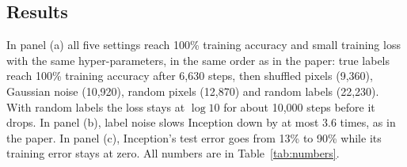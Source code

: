\subsection{Results}
In panel (a) all five settings reach 100\% training accuracy and small training loss with the same hyper-parameters, in the same order as in the paper: true labels reach 100\% training accuracy after 6{,}630 steps, then shuffled pixels (9{,}360), Gaussian noise (10{,}920), random pixels (12{,}870) and random labels (22{,}230). With random labels the loss stays at $\log 10$ for about 10{,}000 steps before it drops. In panel (b), label noise slows Inception down by at most 3.6 times, as in the paper. In panel (c), Inception's test error goes from 13\% to 90\% while its training error stays at zero. All numbers are in Table~\ref{tab:numbers}.

